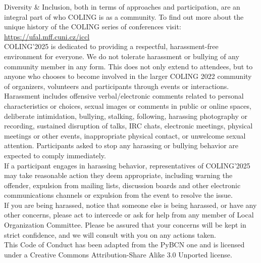 Diversity \& Inclusion, both in terms of approaches and participation, are an integral part of who COLING is as a community. To find out more about the unique history of the COLING series of conferences visit: \url{https://ufal.mff.cuni.cz/iccl} \\

COLING’2025 is dedicated to providing a respectful, harassment-free environment for everyone. We do not tolerate harassment or bullying of any community member in any form. This does not only extend to attendees, but to anyone who chooses to become involved in the larger COLING 2022 community of organizers, volunteers and participants through events or interactions.\\
Harassment includes offensive verbal/electronic comments related to personal characteristics or choices, sexual images or comments in public or online spaces, deliberate intimidation, bullying, stalking, following, harassing photography or recording, sustained disruption of talks, IRC chats, electronic meetings, physical meetings or other events, inappropriate physical contact, or unwelcome sexual attention. Participants asked to stop any harassing or bullying behavior are expected to comply immediately.\\

If a participant engages in harassing behavior, representatives of COLING’2025 may take reasonable action they deem appropriate, including warning the offender, expulsion from mailing lists, discussion boards and other electronic communications channels or expulsion from the event to resolve the issue.\\
If you are being harassed, notice that someone else is being harassed, or have any other concerns, please act to intercede or ask for help from any member of Local Organization Committee. Please be assured that your concerns will be kept in strict confidence, and we will consult with you on any actions taken.\\
This Code of Conduct has been adapted from the PyBCN one and is licensed under a Creative Commons Attribution-Share Alike 3.0 Unported license.\\